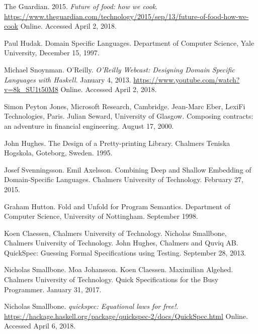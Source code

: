 \documentclass[11pt]{article}
\begin{document}
\newpage

    \begin{thebibliography}{14}

        The Guardian. 2015. \textit{Future of food: how we cook}.
        \url{https://www.theguardian.com/technology/2015/sep/13/future-of-food-how-we-cook}
        Online. Accessed April 2, 2018.

        Paul Hudak. Domain Specific Languages. Department of Computer
        Science, Yale University, December 15, 1997.

        Michael Snoynman. O'Reilly. \textit{O'Reilly Webcast: Designing
        Domain Specific Languages with Haskell}. January 4, 2013.
        \url{https://www.youtube.com/watch?v=8k_SU1t50M8}
        Online. Accessed April 2, 2018.

        Simon Peyton Jones, Microsoft Research, Cambridge.
        Jean-Marc Eber, LexiFi Technologies, Paris. Julian Seward,
        University of Glasgow. Composing contracts: an adventure in
        financial engineering. August 17, 2000.

        John Hughes. The Design of a Pretty-printing Library.
        Chalmers Teniska Hogskola, Goteborg, Sweden. 1995.

        Josef Svenningsson. Emil Axelsson. Combining Deep and Shallow
        Embedding of Domain-Specific Languages. Chalmers University
        of Technology. February 27, 2015.

        Graham Hutton. Fold and Unfold for Program Semantics. Department of
        Computer Science, University of Nottingham. September 1998.

        Koen Claessen, Chalmers University of Technology. Nicholas Smallbone,
        Chalmers University of Technology. John Hughes, Chalmers and Quviq AB.
        QuickSpec: Guessing Formal Specifications using Testing.
        September 28, 2013.

        Nicholas Smallbone. Moa Johansson. Koen Claessen. Maximilian Algehed.
        Chalmers University of Technology.
        Quick Specifications for the Busy Programmer. January 31, 2017.

        Nicholas Smallbone. \textit{quickspec: Equational laws for free!}.
        \url{https://hackage.haskell.org/package/quickspec-2/docs/QuickSpec.html}
        Online. Accessed April 6, 2018.


\end{thebibliography}
\end{document}
